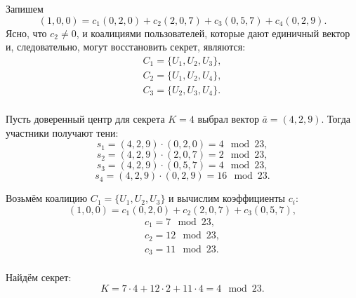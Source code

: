 Запишем
    \[ (1,0,0) = c_1 (0,2,0) + c_2 (2,0,7) + c_3 (0,5,7) + c_4 (0,2,9). \]
Ясно, что $c_2 \neq 0$, и коалициями пользователей, которые дают единичный вектор и, следовательно, могут восстановить секрет, являются:
\[ \begin{array}{l}
    C_1 = \{ U_1, U_2, U_3 \}, \\
    C_2 = \{ U_1, U_2, U_4 \}, \\
    C_3 = \{ U_2, U_3, U_4 \}. \\
\end{array} \]

Пусть доверенный центр для секрета $K = 4$ выбрал вектор $\bar{a} = (4, 2, 9)$. Тогда участники получают тени:
    \[ s_1 = (4,2,9) \cdot (0,2,0) = 4 \mod 23, \]
    \[ s_2 = (4,2,9) \cdot (2,0,7) = 2 \mod 23, \]
    \[ s_3 = (4,2,9) \cdot (0,5,7) = 4 \mod 23, \]
    \[ s_4 = (4,2,9) \cdot (0,2,9) = 16 \mod 23. \]

Возьмём коалицию $C_1 = \{ U_1, U_2, U_3 \}$ и вычислим коэффициенты $c_i$:
    \[ (1,0,0) = c_1 (0,2,0) + c_2 (2,0,7) + c_3 (0,5,7), \]
\[ \begin{array}{l}
    c_1 = 7 \mod 23, \\
    c_2 = 12 \mod 23, \\
    c_3 = 11 \mod 23. \\
\end{array} \]

Найдём секрет:
    \[ K = 7 \cdot 4 + 12 \cdot 2 + 11 \cdot 4 = 4 \mod 23.\]
\exampleend

